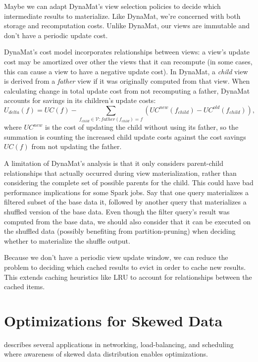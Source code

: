 \documentclass[12pt]{article}
\begin{document}
Maybe we can adapt DynaMat's \cite{dynamat} view selection policies to decide
which intermediate results to materialize.  Like DynaMat, we're concerned with
both storage and recomputation costs.  Unlike DynaMat, our views are immutable
and don't have a periodic update cost.

DynaMat's cost model incorporates relationships between views: a view's
update cost may be amortized over other the views that it can recompute
(in some cases, this can cause a view to have a negative update cost).
In DynaMat, a \emph{child} view is derived from a \emph{father} view if
it was originally computed from that view.  When calculating change in total
update cost from not recomputing a father, DynaMat accounts for savings in its
children's update costs:
\[
    U_{delta}(f)
    =
    UC(f)
    - \sum\limits_{f_{child} \in \mathcal{V} : father(f_{child}) = f}
    \left(UC^{new}(f_{child}) - UC^{old}(f_{child})\right),
\]
where $UC^{new}$ is the cost of updating the child without using its father,
so the summation is counting the increased child update costs against the cost
savings $UC(f)$ from not updating the father.

A limitation of DynaMat's analysis is that it only considers parent-child
relationships that actually occurred during view materialization, rather than
considering the complete set of possible parents for the child.
This could have bad performance implications for some Spark jobs.  Say that one 
query materializes a filtered subset of the base data it, followed by another
query that materializes a shuffled version of the base data.  Even though the
filter query's result was computed from the base data, we should also consider
that it can be executed on the shuffled data (possibly benefiting from
partition-pruning) when deciding whether to materialize the shuffle output.

Because we don't have a periodic view update window, we can reduce the problem
to deciding which cached results to evict in order to cache new results.
This extends caching heuristics like LRU to account for relationships between
the cached items.

\section{Optimizations for Skewed Data}

\cite{perf-eval-heavy-tail} describes several applications in networking,
load-balancing, and scheduling where awareness of skewed data distribution
enables optimizations.
\end{document}

